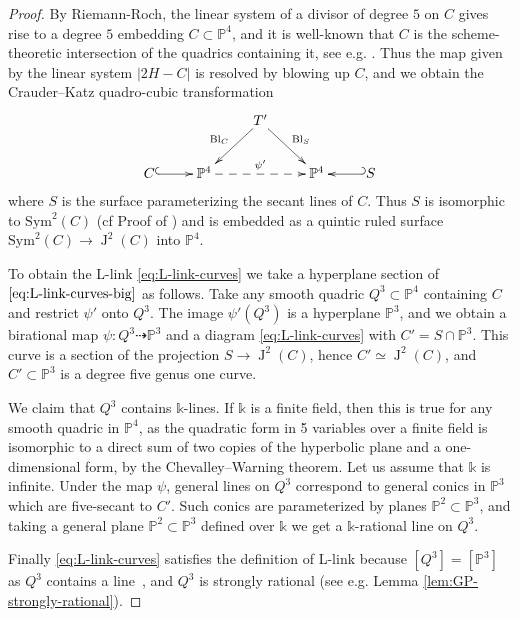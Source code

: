\documentclass[a4paper,12pt]{amsart}
\def\k{\mathbb k}
\def\P{\mathbb P}
\def\Bl{{\operatorname{Bl}}}
\def\Jac{{\operatorname{J}}}
\theoremstyle{plain}
\numberwithin{equation}{section}
\theoremstyle{definition}
\newcommand{\Sym}{\mathrm{Sym}}
\renewcommand{\(}{\left(}
\renewcommand{\)}{\right)}
\newcommand{\dto}{\dashrightarrow}
\begin{document}
\begin{proof}
By Riemann-Roch, the linear
system of a divisor
of degree $5$ on $C$ 
gives rise to a degree $5$ embedding $C \subset \P^4$,
and it is well-known that 
$C$ is the scheme-theoretic intersection 
of the quadrics containing it, see e.g. \cite[Proposition 4.2(ii)]{Fisher-quintics}. 
Thus the map given by the linear system $|2H - C|$
is resolved by blowing up $C$, and we obtain
the Crauder--Katz quadro-cubic transformation \cite[Theorem 2.2(ii)]{Crauder-Katz}
\begin{equation}\label{eq:L-link-curves-big}
 \xymatrix{
    & & T' \ar[dl]_{\Bl_{C}} \ar[dr]^{\Bl_{S}} & & \\
    C \ar@{^{(}->}[r] & \P^4 \ar@{-->}[rr]^{\psi'} &  & \P^4 & \ar@{_{(}->}[l] S \\
}
\end{equation}
where $S$ is the surface
parameterizing the secant lines of $C$. 
Thus $S$ is isomorphic to $\Sym^2(C)$ 
(cf Proof of \cite[Theorem 3.3(A)]{Crauder-Katz})
and
is embedded as a quintic ruled surface $\Sym^2(C) \to \Jac^2(C)$
into $\P^4$.

To obtain the L-link 
\eqref{eq:L-link-curves} we take a hyperplane
section of $\eqref{eq:L-link-curves-big}$ as follows.
Take any smooth quadric $Q^3 \subset \P^4$ containing $C$
and restrict $\psi'$ onto $Q^3$. 
The image $\psi'(Q^3)$
is a hyperplane $\P^3$, 
and we obtain a birational map $\psi: Q^3 \dto \P^3$ and a diagram
\eqref{eq:L-link-curves} with $C' = S \cap \P^3$.
This curve is a section of the projection $S \to \Jac^2(C)$,
hence $C' \simeq \Jac^2(C)$,
and $C' \subset \P^3$
is a degree five genus one curve.

We claim that $Q^3$ contains $\k$-lines. 
If $\k$ is a finite field, then this is true
for any smooth quadric in $\P^4$, as the quadratic form
in 5 variables over a finite field is isomorphic to a direct
sum of two copies of the hyperbolic plane and a one-dimensional
form, by the Chevalley--Warning theorem. 
Let us assume that $\k$ is infinite.
Under the map $\psi$, general lines on $Q^3$ correspond to general
conics in $\P^3$ which are five-secant to $C'$. Such conics
are parameterized by planes $\P^2 \subset \P^3$, and taking
a general 
plane $\P^2 \subset \P^3$
defined over $\k$ we get a $\k$-rational line on $Q^3$.


Finally \eqref{eq:L-link-curves}
satisfies the definition of L-link
because $[Q^3] = [\P^3]$ as $Q^3$ 
contains a line~\cite[Example 2.8]{KuznetsovShinder},
and
$Q^3$ 
is strongly rational
(see e.g. Lemma \ref{lem:GP-strongly-rational}).
\end{proof}
\end{document}
